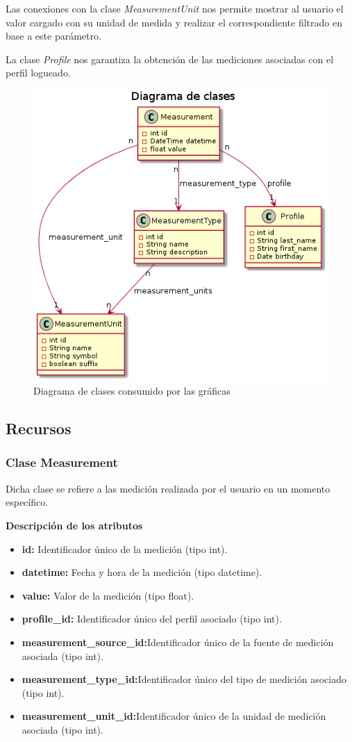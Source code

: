 Las conexiones con la clase \textit{MeasurementUnit} nos permite mostrar al usuario el valor cargado con su unidad de medida y realizar el correspondiente filtrado en base a este parámetro.

La clase \textit{Profile} nos garantiza la obtención de las mediciones asociadas con el perfil logueado.

\begin{figure}[h!]
	\centering
	\includegraphics[width=.8\textwidth]{img/5-clases-graficas}
	\caption{Diagrama de clases consumido por las gráficas}
	\label{5-clases-graficas}
\end{figure}


\subsection{Recursos}
 
\subsubsection{Clase Measurement} 
Dicha clase se refiere a las medición realizada por el usuario en un momento específico. 

\textbf{Descripción de los atributos}
\begin{itemize}
	\item \textbf{id:} Identificador único de la medición (tipo int).
	\item \textbf{datetime:} Fecha y hora de la medición (tipo datetime).
	\item \textbf{value:} Valor de la medición (tipo float).
	\item \textbf{profile\_id:} Identificador único del perfil asociado (tipo int).
	\item \textbf{measurement\_source\_id:}Identificador único de la fuente de medición asociada (tipo int).
	\item \textbf{measurement\_type\_id:}Identificador único del tipo de medición asociado (tipo int).
	\item \textbf{measurement\_unit\_id:}Identificador único de la unidad de medición asociada (tipo int).
	
\end{itemize}

